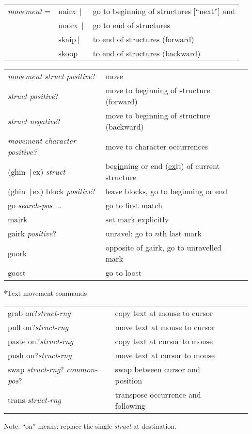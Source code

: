 \documentclass[twocolumn,10pt]{article}
\makeatletter
\renewcommand{\subsection}{\@startsection
  {subsection}{2}{0mm}{-.1\baselineskip}{-.1\baselineskip}%
  {\normalfont\bfseries}}
\newcommand{\vbar}{$\,|\,$}
\newcommand{\opt}{$?$}
\newcommand{\cmd}{\sffamily\upshape}
\newcommand{\cat}[1]{\textrm{\textit{#1}}}
\newenvironment{mycenter}
{\begin{trivlist}\item \begin{footnotesize}}
{\end{footnotesize}\end{trivlist}}
\makeatother
\begin{document}
\begin{mycenter}
\begin{tabular}{lll}
\cat{movement} = 
& \cmd nairx \vbar & go to beginning of structures [``next''] and \\
& \cmd noorx \vbar & go to end of structures \\
& \cmd skaip\vbar & to end of structures (forward) \\
& \cmd skoop & to end of structures (backward) \\
\end{tabular}
\end{mycenter}
\begin{mycenter}
\begin{tabular}{lll}
\cat{movement} \cat{struct} \cat{positive}? & move \\
\cat{struct} \cat{positive}? & move to beginning of structure (forward)\\
\cat{struct} \cat{negative}? & move to beginning of structure (backward)\\
\cat{movement} \em{character}
\cat{positive}? & 
move to
character occurrences  \\
\cmd (ghin \vbar ex) \cat{struct} & be\underline{gin}ning or end (\underline{ex}it) of current structure\\ 
\cmd (ghin \vbar ex) block \cat{positive}\opt & leave blocks,
go to beginning or end \\
\cmd go \cat{search-pos} ... & go to first match\\
\cmd mairk & set mark explicitly\\
\cmd gairk \cat{positive}\opt & unravel: go to $n$th last mark\\
\cmd goork & opposite of gairk, go to unravelled mark\\
\cmd goost & go to loost\\
\end{tabular}
\end{mycenter}


\subsection*{Text movement commands}
\label{sec:movement-commands}
\begin{mycenter}
\begin{tabular}{l@{\,}lll}
\cmd grab on\opt \cat{struct-rng} & copy text at mouse to cursor\\
\cmd pull on\opt \cat{struct-rng} & move text at mouse  to cursor\\
\cmd paste on\opt \cat{struct-rng} & copy text at cursor to mouse\\
\cmd push on\opt \cat{struct-rng} & move text at cursor to mouse\\
\cmd swap \cat{struct-rng}?  \cat{common-pos}?
& swap between cursor  and position\\
\cmd trans \cat{struct-rng} & transpose occurrence and following \\
\end{tabular}
\end{mycenter}
\begin{footnotesize}
Note: ``on'' means: replace the single \cat{struct} at destination.
\end{footnotesize}
\end{document}
